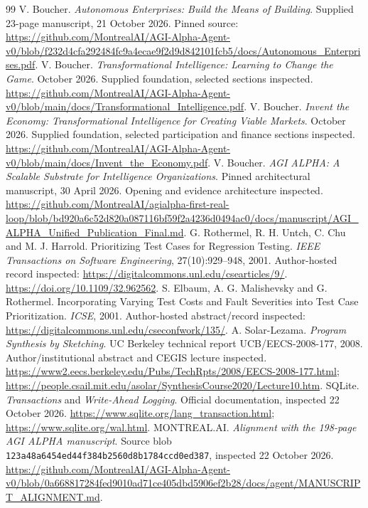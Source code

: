 \documentclass[11pt,letterpaper]{article}
\begin{document}
\begin{thebibliography}{99}\small
{} V. Boucher. \emph{Autonomous Enterprises: Build the Means of Building}. Supplied 23-page manuscript, 21 October 2026. Pinned source: \url{https://github.com/MontrealAI/AGI-Alpha-Agent-v0/blob/f232d4cfa292484fc9a4ecae9f2d9d842101fcb5/docs/Autonomous_Enterprises.pdf}.
 V. Boucher. \emph{Transformational Intelligence: Learning to Change the Game}. October 2026. Supplied foundation, selected sections inspected. \url{https://github.com/MontrealAI/AGI-Alpha-Agent-v0/blob/main/docs/Transformational_Intelligence.pdf}.
 V. Boucher. \emph{Invent the Economy: Transformational Intelligence for Creating Viable Markets}. October 2026. Supplied foundation, selected participation and finance sections inspected. \url{https://github.com/MontrealAI/AGI-Alpha-Agent-v0/blob/main/docs/Invent_the_Economy.pdf}.
 V. Boucher. \emph{AGI ALPHA: A Scalable Substrate for Intelligence Organizations}. Pinned architectural manuscript, 30 April 2026. Opening and evidence architecture inspected. \url{https://github.com/MontrealAI/agialpha-first-real-loop/blob/bd920a6c52d820a087116bf59f2a4236d0494ac0/docs/manuscript/AGI_ALPHA_Unified_Publication_Final.md}.
 G. Rothermel, R. H. Untch, C. Chu and M. J. Harrold. Prioritizing Test Cases for Regression Testing. \emph{IEEE Transactions on Software Engineering}, 27(10):929--948, 2001. Author-hosted record inspected: \url{https://digitalcommons.unl.edu/csearticles/9/}. \url{https://doi.org/10.1109/32.962562}.
 S. Elbaum, A. G. Malishevsky and G. Rothermel. Incorporating Varying Test Costs and Fault Severities into Test Case Prioritization. \emph{ICSE}, 2001. Author-hosted abstract/record inspected: \url{https://digitalcommons.unl.edu/cseconfwork/135/}.
 A. Solar-Lezama. \emph{Program Synthesis by Sketching}. UC Berkeley technical report UCB/EECS-2008-177, 2008. Author/institutional abstract and CEGIS lecture inspected. \url{https://www2.eecs.berkeley.edu/Pubs/TechRpts/2008/EECS-2008-177.html}; \url{https://people.csail.mit.edu/asolar/SynthesisCourse2020/Lecture10.htm}.
 SQLite. \emph{Transactions} and \emph{Write-Ahead Logging}. Official documentation, inspected 22 October 2026. \url{https://www.sqlite.org/lang_transaction.html}; \url{https://www.sqlite.org/wal.html}.
 MONTREAL.AI. \emph{Alignment with the 198-page AGI ALPHA manuscript}. Source blob \nolinkurl{123a48a6454ed44f384b2560d8b1784ccd0ed387}, inspected 22 October 2026. \url{https://github.com/MontrealAI/AGI-Alpha-Agent-v0/blob/0a668817284fed9010ad71ce405dbd5906ef2b28/docs/agent/MANUSCRIPT_ALIGNMENT.md}.

\end{thebibliography}
\end{document}
